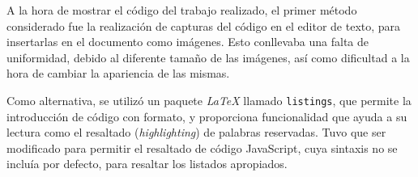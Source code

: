 A la hora de mostrar el código del trabajo realizado, el primer método considerado fue la realización de capturas del código en el editor de texto, para insertarlas en el documento como imágenes.
Esto conllevaba una falta de uniformidad, debido al diferente tamaño de las imágenes, así como dificultad a la hora de cambiar la apariencia de las mismas.

Como alternativa, se utilizó un paquete \textit{LaTeX} llamado \texttt{listings}, que permite la introducción de código con formato, y proporciona funcionalidad que ayuda a su lectura como el resaltado (\textit{highlighting}) de palabras reservadas.
%
Tuvo que ser modificado para permitir el resaltado de código JavaScript, cuya sintaxis no se incluía por defecto, para resaltar los listados apropiados.
